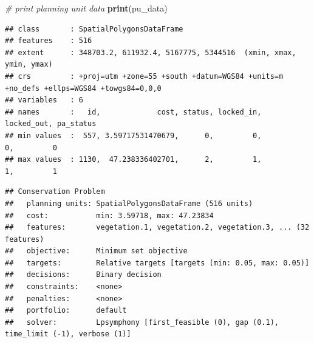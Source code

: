 \documentclass[12pt,]{book}
\newenvironment{Shaded}{\begin{snugshade}}{\end{snugshade}}
\newcommand{\KeywordTok}[1]{\textcolor[rgb]{0.13,0.29,0.53}{\textbf{#1}}}
\newcommand{\DataTypeTok}[1]{\textcolor[rgb]{0.13,0.29,0.53}{#1}}
\newcommand{\FloatTok}[1]{\textcolor[rgb]{0.00,0.00,0.81}{#1}}
\newcommand{\StringTok}[1]{\textcolor[rgb]{0.31,0.60,0.02}{#1}}
\newcommand{\CommentTok}[1]{\textcolor[rgb]{0.56,0.35,0.01}{\textit{#1}}}
\newcommand{\OperatorTok}[1]{\textcolor[rgb]{0.81,0.36,0.00}{\textbf{#1}}}
\newcommand{\NormalTok}[1]{#1}
\begin{document}
\begin{Shaded}
\begin{Highlighting}[]
\CommentTok{# print planning unit data}
\KeywordTok{print}\NormalTok{(pu_data)}
\end{Highlighting}
\end{Shaded}

\begin{verbatim}
## class       : SpatialPolygonsDataFrame 
## features    : 516 
## extent      : 348703.2, 611932.4, 5167775, 5344516  (xmin, xmax, ymin, ymax)
## crs         : +proj=utm +zone=55 +south +datum=WGS84 +units=m +no_defs +ellps=WGS84 +towgs84=0,0,0 
## variables   : 6
## names       :   id,             cost, status, locked_in, locked_out, pa_status 
## min values  :  557, 3.59717531470679,      0,         0,          0,         0 
## max values  : 1130,  47.238336402701,      2,         1,          1,         1
\end{verbatim}

\begin{Shaded}
\end{Shaded}

\begin{verbatim}
## Conservation Problem
##   planning units: SpatialPolygonsDataFrame (516 units)
##   cost:           min: 3.59718, max: 47.23834
##   features:       vegetation.1, vegetation.2, vegetation.3, ... (32 features)
##   objective:      Minimum set objective 
##   targets:        Relative targets [targets (min: 0.05, max: 0.05)]
##   decisions:      Binary decision 
##   constraints:    <none>
##   penalties:      <none>
##   portfolio:      default
##   solver:         Lpsymphony [first_feasible (0), gap (0.1), time_limit (-1), verbose (1)]
\end{verbatim}
\end{document}
